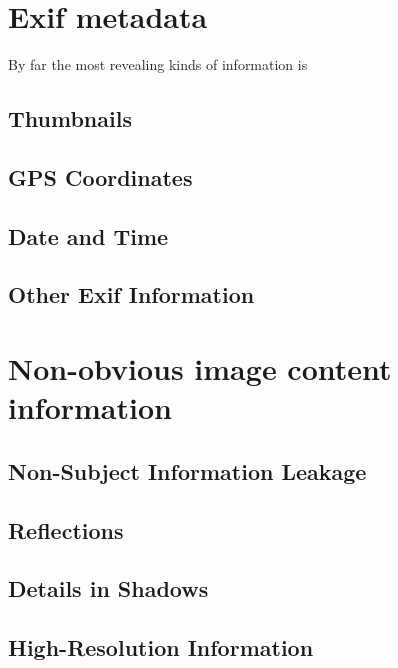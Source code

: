 \section{Exif metadata}\label{sec:exif}
By far the most revealing kinds of information is 

\subsection{Thumbnails}
\subsection{GPS Coordinates}
\subsection{Date and Time}
\subsection{Other Exif Information}

\section{Non-obvious image content information}
\subsection{Non-Subject Information Leakage}
\subsection{Reflections}
\subsection{Details in Shadows}
\subsection{High-Resolution Information}


